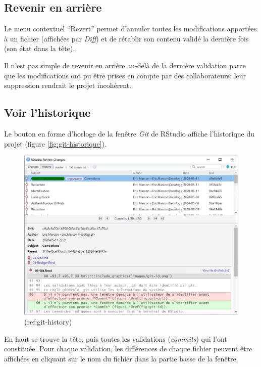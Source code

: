 \documentclass[
  12pt,
  french,
  a4paper,
  extrafontsizes,onecolumn,openright
  ]{memoir}
\begin{document}
\normalsize

\subsection{Revenir en arrière}\label{revenir-en-arriuxe8re}

Le menu contextuel \enquote{Revert} permet d'annuler toutes les modifications apportées à un fichier (affichées par \emph{Diff}) et de rétablir son contenu validé la dernière fois (son état dans la tête).

Il n'est pas simple de revenir en arrière au-delà de la dernière validation parce que les modifications ont pu être prises en compte par des collaborateurs: leur suppression rendrait le projet incohérent.

\subsection{Voir l'historique}\label{voir-lhistorique}

Le bouton en forme d'horloge de la fenêtre \emph{Git} de RStudio affiche l'historique du projet (figure \ref{fig:git-historique}).



\scriptsize

\begin{figure}

{\centering \includegraphics[width=0.8\linewidth]{images/git-historique} 

}

\caption{(ref:git-history)}\label{fig:git-history}
\end{figure}

\normalsize

En haut se trouve la tête, puis toutes les validations (\emph{commits}) qui l'ont constituée.
Pour chaque validation, les différences de chaque fichier peuvent être affichées en cliquant sur le nom du fichier dans la partie basse de la fenêtre.
\end{document}
